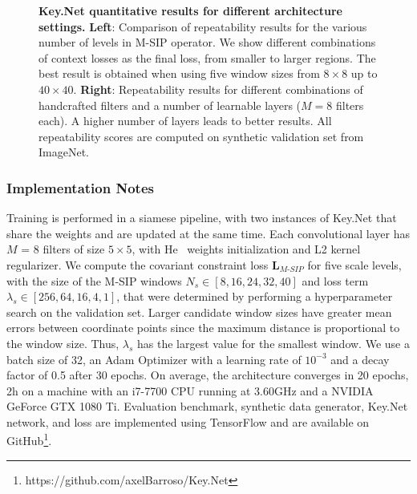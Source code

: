 \begin{figure}[ht]
\begin{minipage}[b]{.57\textwidth}
    \vspace{-2.45cm}
\end{minipage}
\vspace{-0.25cm}
\caption[Key.Net quantitative results for different architecture settings]{\textbf{Key.Net quantitative results for different architecture settings.} \textbf{Left}: Comparison of repeatability results for the various number of levels in M-SIP operator. We show different combinations of context losses as the final loss,  from smaller to larger regions. The best result is obtained when using five window sizes from $8\times 8$ up to $40\times 40$. \textbf{Right}: Repeatability results for different combinations of handcrafted filters and a number of learnable layers ($M=8$ filters each). A higher number of layers leads to better results. All repeatability scores are computed on synthetic validation set from ImageNet.}
\label{table:context_losses_and_learnableblocks}
\end{figure}


\subsubsection{Implementation Notes}
\label{subsec:Implementation_Details}
Training is performed in a siamese pipeline, with two instances of Key.Net that share the weights and are updated at the same time. Each convolutional layer has $M$ = 8 filters of size $5 \times 5$, with He~\cite{HE_initializatio} weights initialization and L2 kernel regularizer. We compute the covariant constraint loss $\mathbf{L}_{M\mbox{-}SIP}$ for five scale levels, with the size of the M-SIP windows $N_s \in [8, 16, 24, 32, 40]$ and loss term $\lambda_s \in [256, 64, 16, 4, 1]$, that were determined by performing a hyperparameter search on the validation set. Larger candidate window sizes have greater mean errors between coordinate points since the maximum distance is proportional to the window size. Thus, $\lambda_s$ has the largest value for the smallest window. We use a batch size of 32, an Adam Optimizer with a learning rate of $10^{-3}$ and a decay factor of 0.5 after 30 epochs. On average, the architecture converges in 20 epochs, 2h on a machine with an i7-7700 CPU running at 3.60GHz and a NVIDIA GeForce GTX 1080 Ti. Evaluation benchmark, synthetic data generator, Key.Net network, and loss are implemented using TensorFlow and are available on GitHub\footnote{https://github.com/axelBarroso/Key.Net}. 


